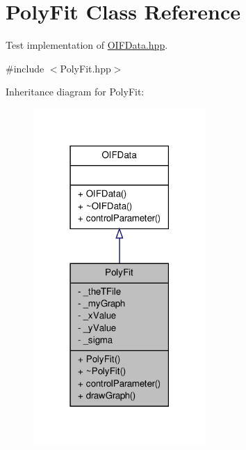 \hypertarget{classPolyFit}{
\section{PolyFit Class Reference}
\label{de/d89/classPolyFit}
}


Test implementation of \hyperlink{OIFData_8hpp}{OIFData.hpp}.  




{\ttfamily \#include $<$PolyFit.hpp$>$}



Inheritance diagram for PolyFit:\nopagebreak
\begin{figure}[H]
\begin{center}
\leavevmode
\includegraphics[width=186pt]{da/d58/classPolyFit__inherit__graph}
\end{center}
\end{figure}


